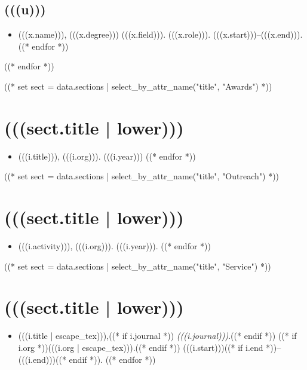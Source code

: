 \documentclass[11pt,article,oneside]{memoir}
\begin{document}
\subsection{(((u)))}
\begin{itemize}[label={}]
((* for x in i | sort_by_attr(["end", "start"], reverse=True) *))
\item (((x.name))), (((x.degree))) (((x.field))). (((x.role))). (((x.start)))--(((x.end))).
((* endfor *))
\end{itemize}
((* endfor *))

((* set sect = data.sections | select_by_attr_name("title", "Awards") *))
\section{(((sect.title | lower)))}

\mbox{}\vspace{-\dimexpr\baselineskip\relax}

\begin{itemize}[label={}]
((* for i in sect.entries.awards | sort_by_attr(["year"], reverse=True) *))
\item (((i.title))), (((i.org))). (((i.year)))
((* endfor *))
\end{itemize}

((* set sect = data.sections | select_by_attr_name("title", "Outreach") *))
\section{(((sect.title | lower)))}

\mbox{}\vspace{-\dimexpr\baselineskip\relax}

\begin{itemize}[label={}]
((* for i in sect.entries.outreach | sort_first_year("year", reverse=True) *))
\item (((i.activity))), (((i.org))). (((i.year))).
((* endfor *))
\end{itemize}

((* set sect = data.sections | select_by_attr_name("title", "Service") *))
\section{(((sect.title | lower)))}

\mbox{}\vspace{-\dimexpr\baselineskip\relax}

\begin{itemize}[label={}]
((* for i in sect.entries.service *))
\item (((i.title | escape_tex))),((* if i.journal *)) \emph{(((i.journal)))}.((* endif *)) ((* if i.org *))(((i.org | escape_tex))).((* endif *)) (((i.start)))((* if i.end *))--(((i.end)))((* endif *)).
((* endfor *))
\end{itemize}
\end{document}
